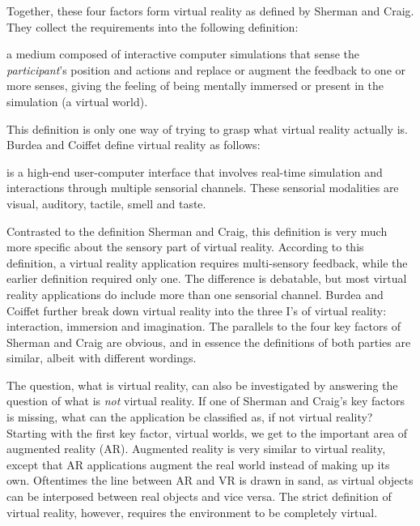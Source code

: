 \documentclass[12pt,a4paper,oneside,pdftex]{report}
\begin{document}
Together, these four factors form virtual reality as defined by Sherman and Craig. They collect the requirements into the following definition:

\begin{description} \label{definition:vr-sherman}
\item[Virtual Reality] 
a medium composed of interactive computer simulations that sense the \emph{participant}'s position and actions and replace or augment the feedback to one or more senses, giving the feeling of being mentally immersed or present in the simulation (a virtual world). \cite{Sherman:2002:UVR:581839}
\end{description}

This definition is only one way of trying to grasp what virtual reality actually is. Burdea and Coiffet define virtual reality as follows:

\begin{description} \label{definition:vr-burdea}
\item[Virtual Reality] 
is a high-end user-computer interface that involves real-time simulation and interactions through multiple sensorial channels. These sensorial modalities are visual, auditory, tactile, smell and taste. \cite{Burdea:2003:VRT:829566}
\end{description}

Contrasted to the definition Sherman and Craig, this definition is very much more specific about the sensory part of virtual reality. According to this definition, a virtual reality application requires multi-sensory feedback, while the earlier definition required only one. The difference is debatable, but most virtual reality applications do include more than one sensorial channel. Burdea and Coiffet further break down virtual reality into the three I's of virtual reality: interaction, immersion and imagination. The parallels to the four key factors of Sherman and Craig are obvious, and in essence the definitions of both parties are similar, albeit with different wordings.

The question, what is virtual reality, can also be investigated by answering the question of what is \emph{not} virtual reality. If one of Sherman and Craig's key factors is missing, what can the application be classified as, if not virtual reality? Starting with the first key factor, virtual worlds, we get to the important area of augmented reality (AR). Augmented reality is very similar to virtual reality, except that AR applications augment the real world instead of making up its own. Oftentimes the line between AR and VR is drawn in sand, as virtual objects can be interposed between real objects and vice versa. The strict definition of virtual reality, however, requires the environment to be completely virtual.
\end{document}
